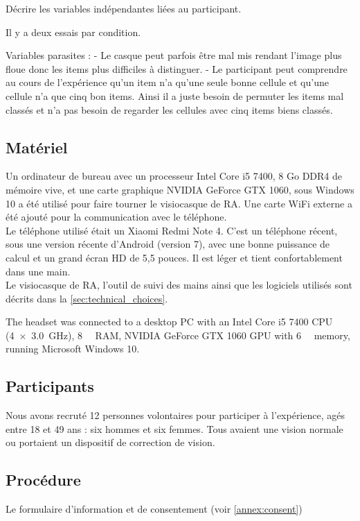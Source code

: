 Décrire les variables indépendantes liées au participant.

Il y a deux essais par condition.

Variables parasites : 
- Le casque peut parfois être mal mis rendant l'image plus floue donc les items plus difficiles à distinguer.
- Le participant peut comprendre au cours de l'expérience qu'un item n'a qu'une seule bonne cellule et qu'une cellule n'a que cinq bon items. Ainsi il a juste besoin de permuter les items mal classés et n'a pas besoin de regarder les cellules avec cinq items biens classés. 

\subsection{Matériel}
Un ordinateur de bureau avec un processeur Intel Core i5 7400, 8 Go DDR4 de mémoire vive, et une carte graphique NVIDIA GeForce GTX 1060, sous Windows 10 a été utilisé pour faire tourner le visiocasque de RA. Une carte WiFi externe a été ajouté pour la communication avec le téléphone.\\
Le téléphone utilisé était un Xiaomi Redmi Note 4. C'est un téléphone récent, sous une version récente d'Android (version 7), avec une bonne puissance de calcul et un grand écran HD de 5,5 pouces. Il est léger et tient confortablement dans une main.\\
Le visiocasque de RA, l'outil de suivi des mains ainsi que les logiciels utilisés sont décrits dans la \autoref{sec:technical_choices}.

The headset was connected to a desktop PC with an Intel Core i5 7400 CPU (\SI[product-units = single]{4x3.0}{\GHz}), \SI{8}{\giga\byte} RAM, NVIDIA GeForce GTX 1060 GPU with \SI{6}{\giga\byte} memory, running Microsoft Windows 10.

\subsection{Participants}
Nous avons recruté 12 personnes volontaires pour participer à l'expérience, agés entre 18 et 49 ans : six hommes et six femmes. Tous avaient une vision normale ou portaient un dispositif de correction de vision.

\subsection{Procédure}
Le formulaire d'information et de consentement (voir \autoref{annex:consent})

